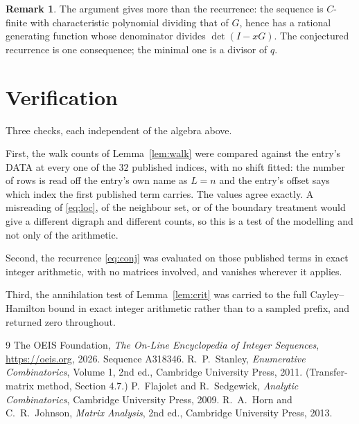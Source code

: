 \documentclass[11pt,a4paper]{article}
\theoremstyle{plain}
\theoremstyle{definition}
\newtheorem{remark}[theorem]{Remark}
\begin{document}
\begin{remark}
The argument gives more than the recurrence: the sequence is $C$-finite with characteristic
polynomial dividing that of $G$, hence has a rational generating function whose denominator
divides $\det(I-xG)$. The conjectured recurrence is one consequence; the minimal one is a
divisor of $q$.
\end{remark}

\section{Verification}

Three checks, each independent of the algebra above.

First, the walk counts of Lemma~\ref{lem:walk} were compared against the entry's DATA at
every one of the $32$ published indices, with no shift fitted: the number of rows is
read off the entry's own name as $L=n$ and the entry's offset says which index the first
published term carries. The values agree exactly. A misreading of \eqref{eq:loc}, of the
neighbour set, or of the boundary treatment would give a different digraph and different
counts, so this is a test of the modelling and not only of the arithmetic.

Second, the recurrence \eqref{eq:conj} was evaluated on those published terms in exact
integer arithmetic, with no matrices involved, and vanishes wherever it applies.

Third, the annihilation test of Lemma~\ref{lem:crit} was carried to the full
Cayley--Hamilton bound in exact integer arithmetic rather than to a sampled prefix, and
returned zero throughout.

\begin{thebibliography}{9}
 The OEIS Foundation, \emph{The On-Line Encyclopedia of Integer
Sequences}, \url{https://oeis.org}, 2026. Sequence A318346.
 R.~P.~Stanley, \emph{Enumerative Combinatorics}, Volume 1, 2nd ed.,
Cambridge University Press, 2011. (Transfer-matrix method, Section 4.7.)
 P.~Flajolet and R.~Sedgewick, \emph{Analytic Combinatorics}, Cambridge
University Press, 2009.
 R.~A.~Horn and C.~R.~Johnson, \emph{Matrix Analysis}, 2nd ed., Cambridge
University Press, 2013.
\end{thebibliography}
\end{document}
